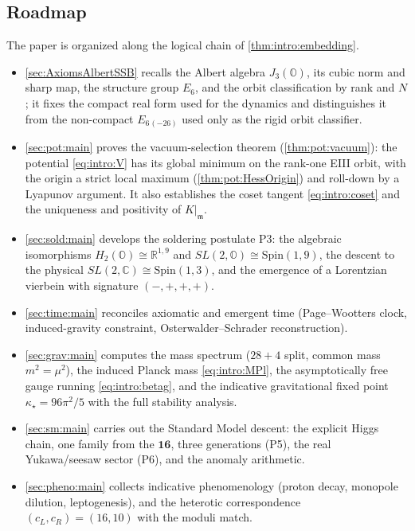 \documentclass[11pt]{article}
\theoremstyle{plain}
\theoremstyle{definition}
\theoremstyle{remark}
\begin{document}
\subsection{Roadmap}
\label{sec:intro:roadmap}

The paper is organized along the logical chain of \autoref{thm:intro:embedding}.

\begin{itemize}
  \item \autoref{sec:AxiomsAlbertSSB} recalls the Albert algebra
    $J_3(\mathbb{O})$, its cubic norm and sharp map, the structure group $E_6$,
    and the orbit classification by rank and $N$; it fixes the compact real form
    used for the dynamics and distinguishes it from the non-compact
    $E_6{}_{(-26)}$ used only as the rigid orbit classifier.
  \item \autoref{sec:pot:main} proves the vacuum-selection theorem
    (\autoref{thm:pot:vacuum}): the potential \eqref{eq:intro:V} has its global
    minimum on the rank-one EIII orbit, with the origin a strict local maximum
    (\autoref{thm:pot:HessOrigin}) and roll-down by a Lyapunov argument. It also
    establishes the coset tangent \eqref{eq:intro:coset} and the uniqueness and
    positivity of $K|_{\mathfrak{m}}$.
  \item \autoref{sec:sold:main} develops the soldering postulate P3: the
    algebraic isomorphisms $H_2(\mathbb{O})\cong\mathbb{R}^{1,9}$ and
    $SL(2,\mathbb{O})\cong\mathrm{Spin}(1,9)$, the descent to the physical
    $SL(2,\mathbb{C})\cong\mathrm{Spin}(1,3)$, and the emergence of a Lorentzian
    vierbein with signature $(-,+,+,+)$.
  \item \autoref{sec:time:main} reconciles axiomatic and emergent time
    (Page--Wootters clock, induced-gravity constraint, Osterwalder--Schrader
    reconstruction).
  \item \autoref{sec:grav:main} computes the mass spectrum
    ($28+4$ split, common mass $m^2=\mu^2$), the induced Planck mass
    \eqref{eq:intro:MPl}, the asymptotically free gauge running
    \eqref{eq:intro:betag}, and the indicative gravitational fixed point
    $\kappa_\star=96\pi^{2}/5$ with the full stability analysis.
  \item \autoref{sec:sm:main} carries out the Standard Model descent: the
    explicit Higgs chain, one family from the $\mathbf{16}$, three generations
    (P5), the real Yukawa/seesaw sector (P6), and the anomaly arithmetic.
  \item \autoref{sec:pheno:main} collects indicative phenomenology (proton
    decay, monopole dilution, leptogenesis), and the heterotic correspondence
    $(c_L,c_R)=(16,10)$ with the moduli match.
\end{itemize}
\end{document}
